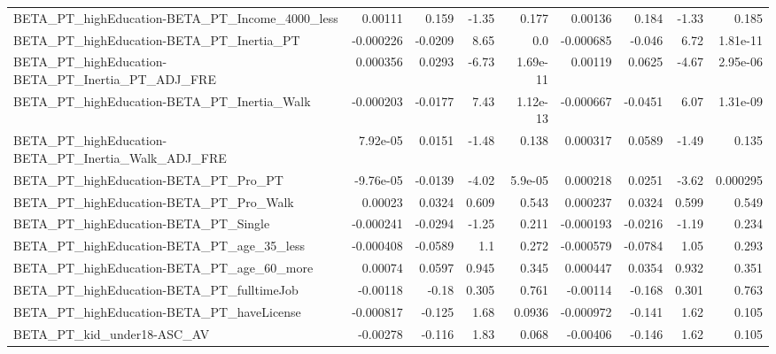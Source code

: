 \begin{tabular}{lrrrrrrrr}
BETA\_PT\_highEducation-BETA\_PT\_Income\_4000\_less     &     0.00111 &        0.159 &    -1.35 &    0.177 &    0.00136 &       0.184 &        -1.33 &         0.185 \\
BETA\_PT\_highEducation-BETA\_PT\_Inertia\_PT           &   -0.000226 &      -0.0209 &     8.65 &      0.0 &  -0.000685 &      -0.046 &         6.72 &      1.81e-11 \\
BETA\_PT\_highEducation-BETA\_PT\_Inertia\_PT\_ADJ\_FRE   &    0.000356 &       0.0293 &    -6.73 & 1.69e-11 &    0.00119 &      0.0625 &        -4.67 &      2.95e-06 \\
BETA\_PT\_highEducation-BETA\_PT\_Inertia\_Walk         &   -0.000203 &      -0.0177 &     7.43 & 1.12e-13 &  -0.000667 &     -0.0451 &         6.07 &      1.31e-09 \\
BETA\_PT\_highEducation-BETA\_PT\_Inertia\_Walk\_ADJ\_FRE &    7.92e-05 &       0.0151 &    -1.48 &    0.138 &   0.000317 &      0.0589 &        -1.49 &         0.135 \\
BETA\_PT\_highEducation-BETA\_PT\_Pro\_PT               &   -9.76e-05 &      -0.0139 &    -4.02 &  5.9e-05 &   0.000218 &      0.0251 &        -3.62 &      0.000295 \\
BETA\_PT\_highEducation-BETA\_PT\_Pro\_Walk             &     0.00023 &       0.0324 &    0.609 &    0.543 &   0.000237 &      0.0324 &        0.599 &         0.549 \\
BETA\_PT\_highEducation-BETA\_PT\_Single               &   -0.000241 &      -0.0294 &    -1.25 &    0.211 &  -0.000193 &     -0.0216 &        -1.19 &         0.234 \\
BETA\_PT\_highEducation-BETA\_PT\_age\_35\_less          &   -0.000408 &      -0.0589 &      1.1 &    0.272 &  -0.000579 &     -0.0784 &         1.05 &         0.293 \\
BETA\_PT\_highEducation-BETA\_PT\_age\_60\_more          &     0.00074 &       0.0597 &    0.945 &    0.345 &   0.000447 &      0.0354 &        0.932 &         0.351 \\
BETA\_PT\_highEducation-BETA\_PT\_fulltimeJob          &    -0.00118 &        -0.18 &    0.305 &    0.761 &   -0.00114 &      -0.168 &        0.301 &         0.763 \\
BETA\_PT\_highEducation-BETA\_PT\_haveLicense          &   -0.000817 &       -0.125 &     1.68 &   0.0936 &  -0.000972 &      -0.141 &         1.62 &         0.105 \\
BETA\_PT\_kid\_under18-ASC\_AV                         &    -0.00278 &       -0.116 &     1.83 &    0.068 &   -0.00406 &      -0.146 &         1.62 &         0.105 \\

\end{tabular}
